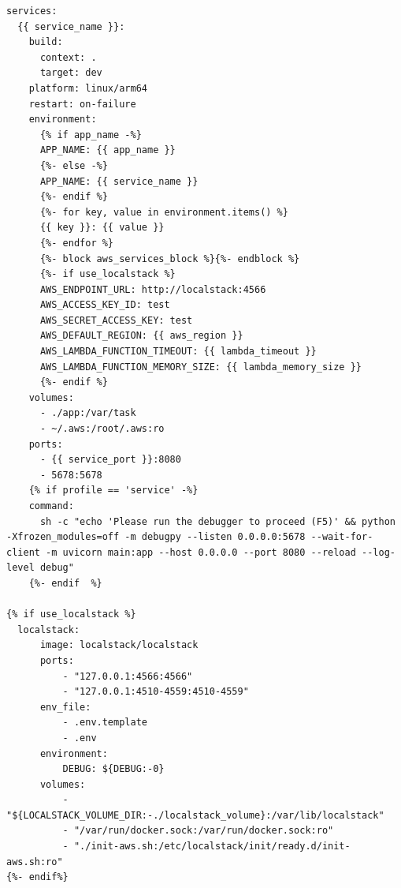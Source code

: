 \begin{lstlisting}[label={lst:template-compose}]
services:
  {{ service_name }}:
    build:
      context: .
      target: dev
    platform: linux/arm64
    restart: on-failure
    environment:
      {% if app_name -%}
      APP_NAME: {{ app_name }}
      {%- else -%}
      APP_NAME: {{ service_name }}
      {%- endif %}
      {%- for key, value in environment.items() %}
      {{ key }}: {{ value }}
      {%- endfor %}
      {%- block aws_services_block %}{%- endblock %}
      {%- if use_localstack %}
      AWS_ENDPOINT_URL: http://localstack:4566
      AWS_ACCESS_KEY_ID: test
      AWS_SECRET_ACCESS_KEY: test
      AWS_DEFAULT_REGION: {{ aws_region }}
      AWS_LAMBDA_FUNCTION_TIMEOUT: {{ lambda_timeout }}
      AWS_LAMBDA_FUNCTION_MEMORY_SIZE: {{ lambda_memory_size }}
      {%- endif %}
    volumes:
      - ./app:/var/task
      - ~/.aws:/root/.aws:ro
    ports:
      - {{ service_port }}:8080
      - 5678:5678
    {% if profile == 'service' -%}
    command:
      sh -c "echo 'Please run the debugger to proceed (F5)' && python -Xfrozen_modules=off -m debugpy --listen 0.0.0.0:5678 --wait-for-client -m uvicorn main:app --host 0.0.0.0 --port 8080 --reload --log-level debug"
    {%- endif  %}

{% if use_localstack %}
  localstack:
      image: localstack/localstack
      ports:
          - "127.0.0.1:4566:4566"
          - "127.0.0.1:4510-4559:4510-4559"
      env_file:
          - .env.template
          - .env
      environment:
          DEBUG: ${DEBUG:-0}
      volumes:
          - "${LOCALSTACK_VOLUME_DIR:-./localstack_volume}:/var/lib/localstack"
          - "/var/run/docker.sock:/var/run/docker.sock:ro"
          - "./init-aws.sh:/etc/localstack/init/ready.d/init-aws.sh:ro"
{%- endif%}
\end{lstlisting}